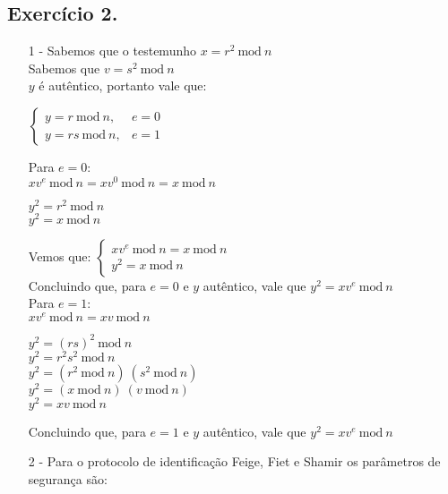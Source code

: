 \documentclass[12pt]{article}
\newcommand{\modd}{\ \text{mod}\ }
\begin{document}
	\subsection*{Exercício 2.}
		\begin{itemize}
			\item[1 -]
				Sabemos que o testemunho $x = r^2 \modd n $\\
				Sabemos que $v = s^2 \modd n$\\
				$y$ é autêntico, portanto vale que:
				\begin{center}								
					$ \begin{cases} 
					y = r \modd n, & e = 0 \\ 
					y = rs \modd n, & e = 1
					\end{cases}
					$
				\end{center}
				Para $e = 0$:\\
				$xv^{e} \modd n = xv^{0} \modd n = x \modd n$\\
				\begin{center} 
					$y^2 = r^2 \modd n$\\
					$y^2 = x \modd n$\\
				\end{center}
				Vemos que:
				$ \begin{cases} 
					xv^{e} \modd n =  x \modd n \\ y^2 = x \modd n
					\end{cases}
				$\\
				Concluindo que, para $e = 0$ e $y$ autêntico, vale que $y^2 = xv^{e} 
				\modd n$\\
				\newline
				Para $e = 1$:\\
				$xv^{e} \modd n = xv \modd n$\\
				\begin{center} 
					$y^2 = (rs)^2 \modd n$\\
					$y^2 = r^2s^2 \modd n$\\
					$y^2 = (r^2 \modd n) \ (s^2 \modd n)$\\
					$y^2 = (x \modd n) \ (v \modd n)$\\
					$y^2 = xv \modd n$\\					
				\end{center}
				Concluindo que, para $e = 1$ e $y$ autêntico, vale que $y^2 = xv^{e}
				\modd n$
			\item[2 -]
				Para o protocolo de identificação Feige, Fiet e Shamir os parâmetros
				de segurança são:
					\begin{itemize}

\end{itemize}
\end{itemize}
\end{document}
